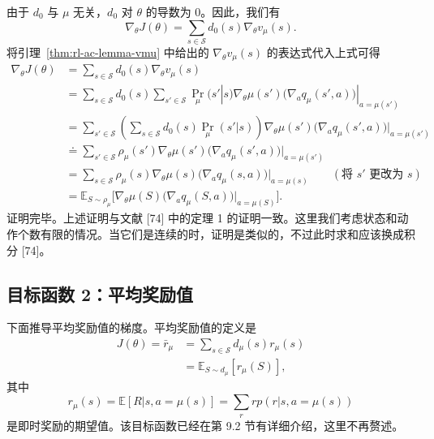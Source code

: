 \begin{derivation}\label{box:rl-ac-dpg-disc-proof}
由于 $d_{0}$ 与 $\mu$ 无关，$d_{0}$ 对 $\theta$ 的导数为 0。因此，我们有
\[
\nabla_{\theta} J(\theta) = \sum_{s \in \mathcal{S}} d_{0}(s) \nabla_{\theta} v_{\mu}(s).
\]
将引理~\ref{thm:rl-ac-lemma-vmu} 中给出的 $\nabla_{\theta} v_{\mu}(s)$ 的表达式代入上式可得
\[
\begin{aligned}
\nabla_{\theta} J(\theta) &= \sum_{s \in \mathcal{S}} d_{0}(s) \nabla_{\theta} v_{\mu}(s) \\
&= \sum_{s \in \mathcal{S}} d_{0}(s) \sum_{s' \in \mathcal{S}} \operatorname{Pr}_{\mu}(s' | s) \nabla_{\theta} \mu(s') \big( \nabla_{a} q_{\mu}(s', a) \big) |_{a = \mu(s')} \\
&= \sum_{s' \in \mathcal{S}} \left( \sum_{s \in \mathcal{S}} d_{0}(s) \operatorname{Pr}_{\mu}(s' | s) \right) \nabla_{\theta} \mu(s') \big( \nabla_{a} q_{\mu}(s', a) \big) |_{a = \mu(s')} \\
&\doteq \sum_{s' \in \mathcal{S}} \rho_{\mu}(s') \nabla_{\theta} \mu(s') \big( \nabla_{a} q_{\mu}(s', a) \big) |_{a = \mu(s')} \\
&= \sum_{s \in \mathcal{S}} \rho_{\mu}(s) \nabla_{\theta} \mu(s) \big( \nabla_{a} q_{\mu}(s, a) \big) |_{a = \mu(s)} \qquad (\text{将 } s' \text{ 更改为 } s) \\
&= \mathbb{E}_{S \sim \rho_{\mu}} \big[ \nabla_{\theta} \mu(S) \big( \nabla_{a} q_{\mu}(S, a) \big) |_{a = \mu(S)} \big].
\end{aligned}
\]
证明完毕。上述证明与文献 [74] 中的定理 1 的证明一致。这里我们考虑状态和动作个数有限的情况。当它们是连续的时，证明是类似的，不过此时求和应该换成积分 [74]。
\end{derivation}

\subsection*{目标函数 2：平均奖励值}

下面推导平均奖励值的梯度。平均奖励值的定义是
\begin{equation}
\begin{aligned}
J(\theta) = \bar{r}_{\mu} &= \sum_{s \in \mathcal{S}} d_{\mu}(s) r_{\mu}(s) \\
&= \mathbb{E}_{S \sim d_{\mu}}[r_{\mu}(S)],
\end{aligned}
\label{eq:rl-ac-J-avgreward}
\end{equation}
其中
\[
r_{\mu}(s) = \mathbb{E}[R | s, a = \mu(s)] = \sum_{r} r p(r | s, a = \mu(s))
\]
是即时奖励的期望值。该目标函数已经在第 9.2 节有详细介绍，这里不再赘述。

